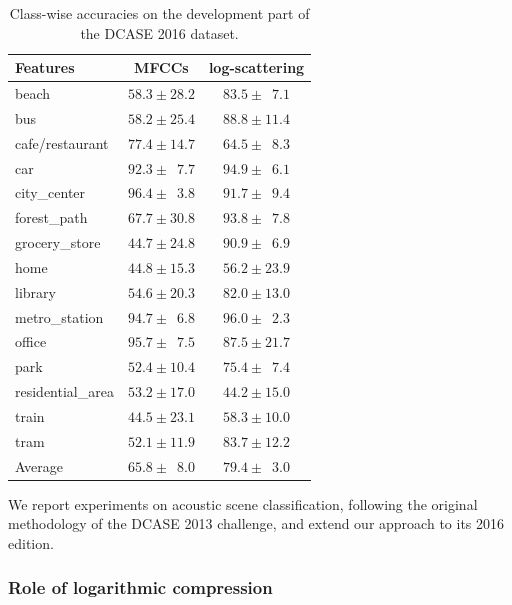 \documentclass[journal]{IEEEtran}
\begin{document}
\begin{table}
\begin{center}
\caption{Class-wise accuracies on the development part of the DCASE 2016 dataset.\label{table:dcase2016}}
\begin{tabular}{lcc}
Features & MFCCs & log-scattering \\
\midrule
beach & $58.3 \pm 28.2$ & $83.5 \pm \phantom{0}7.1$ \\
bus & $58.2 \pm 25.4$ & $88.8 \pm 11.4$ \\
cafe/restaurant & $77.4 \pm 14.7$ & $64.5 \pm \phantom{0}8.3$ \\
car & $92.3 \pm \phantom{0}7.7$ & $94.9 \pm \phantom{0}6.1$ \\
city\_center & $96.4 \pm \phantom{0}3.8$ & $91.7 \pm \phantom{0}9.4$ \\
forest\_path & $67.7 \pm 30.8$ & $93.8 \pm \phantom{0}7.8$ \\
grocery\_store & $44.7 \pm 24.8$ & $90.9 \pm \phantom{0}6.9$ \\
home & $44.8 \pm 15.3$ & $56.2 \pm 23.9$ \\
library & $54.6 \pm 20.3$ & $82.0 \pm 13.0$ \\
metro\_station & $94.7 \pm \phantom{0}6.8$ & $96.0 \pm \phantom{0}2.3$ \\
office & $95.7 \pm \phantom{0}7.5$ & $87.5 \pm 21.7$ \\
park & $52.4 \pm 10.4$ & $75.4 \pm \phantom{0}7.4$ \\
residential\_area & $53.2 \pm 17.0$ & $44.2 \pm 15.0$ \\
train & $44.5 \pm 23.1$ & $58.3 \pm 10.0$ \\
tram & $52.1 \pm 11.9$ & $83.7 \pm 12.2$ \\
\bottomrule
Average & $65.8 \pm \phantom{0}8.0$ & $79.4 \pm \phantom{0}3.0$ \\
\end{tabular}
\end{center}

\end{table}

We report experiments on acoustic scene classification, following the original methodology of the DCASE 2013 challenge, and extend our approach to its 2016 edition.

\subsubsection*{Role of logarithmic compression}
\end{document}
